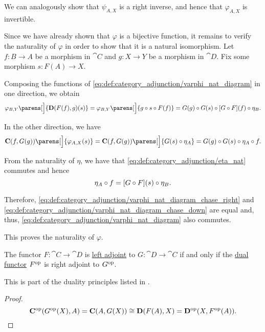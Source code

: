 \begin{defproof}
  We can analogously show that \( \psi_{A,X} \) is a right inverse, and hence that \( \varphi_{A,X} \) is invertible.

  Since we have already shown that \( \varphi \) is a bijective function, it remains to verify the naturality of \( \varphi \) in order to show that it is a natural isomorphism. Let \( f: B \to A \) be a morphism in \( \cat{C} \) and \( g: X \to Y \) be a morphism in \( \cat{D} \). Fix some morphism \( s: F(A) \to X \).

  Composing the functions of \eqref{eq:def:category_adjunction/varphi_nat_diagram} in one direction, we obtain
  \begin{equation}\label{eq:def:category_adjunction/varphi_nat_diagram_chase_right}
    \varphi_{B, Y}\parens[\Big]{ \cat{D}(F(f), g)(s) }
    =
    \varphi_{B, Y}\parens[\Big]{ g \bincirc s \bincirc F(f) }
    =
    G(g) \bincirc G(s) \bincirc [G \bincirc F](f) \bincirc \eta_B.
  \end{equation}

  In the other direction, we have
  \begin{equation}\label{eq:def:category_adjunction/varphi_nat_diagram_chase_down}
    \cat{C}(f, G(g))\parens[\Big]{ \varphi_{A, X}(s) }
    =
    \cat{C}(f, G(g))\parens[\Big]{ G(s) \bincirc \eta_A }
    =
    G(g) \bincirc G(s) \bincirc \eta_A \bincirc f.
  \end{equation}

  From the naturality of \( \eta \), we have that \eqref{eq:def:category_adjunction/eta_nat} commutes and hence
  \begin{equation*}
    \eta_A \bincirc f
    =
    [G \bincirc F](s) \bincirc \eta_B.
  \end{equation*}

  Therefore, \eqref{eq:def:category_adjunction/varphi_nat_diagram_chase_right} and \eqref{eq:def:category_adjunction/varphi_nat_diagram_chase_down} are equal and, thus, \eqref{eq:def:category_adjunction/varphi_nat_diagram} also commutes.

  This proves the naturality of \( \varphi \).
\end{defproof}

\begin{proposition}\label{thm:category_adjunction_duality}
  The functor \( F: \cat{C} \to \cat{D} \) is \hyperref[def:category_adjunction]{left adjoint} to \( G: \cat{D} \to \cat{C} \) if and only if the \hyperref[def:opposite_functor]{dual functor} \( F^{\operatorname{op}} \) is right adjoint to \( G^{\operatorname{op}} \).

  This is part of the duality principles listed in .
\end{proposition}
\begin{proof}
  \begin{equation*}
    \operatorname{\mathbf{C^{\operatorname{op}}}}(G^{\operatorname{op}}(X), A) = \operatorname{\mathbf{C}}(A, G(X)) \cong \operatorname{\mathbf{D}}(F(A), X) = \operatorname{\mathbf{D^{\operatorname{op}}}}(X, F^{\operatorname{op}}(A)).
  \end{equation*}
\end{proof}

